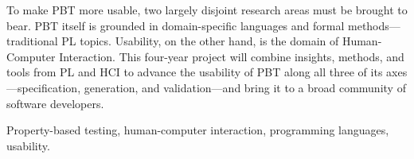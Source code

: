 

To make PBT more usable, two largely disjoint research areas must be
brought to bear.  PBT itself is grounded in domain-specific languages
and formal methods---traditional PL topics.  Usability, on the other
hand, is the domain of Human-Computer Interaction.
%
This four-year project will combine insights, methods, and tools from
PL and HCI to advance the usability of PBT along all three of its
axes---specification, generation, and validation---and bring it to a
broad community of software developers.

\smallskip

 Property-based testing, human-computer
interaction, programming languages, usability.

